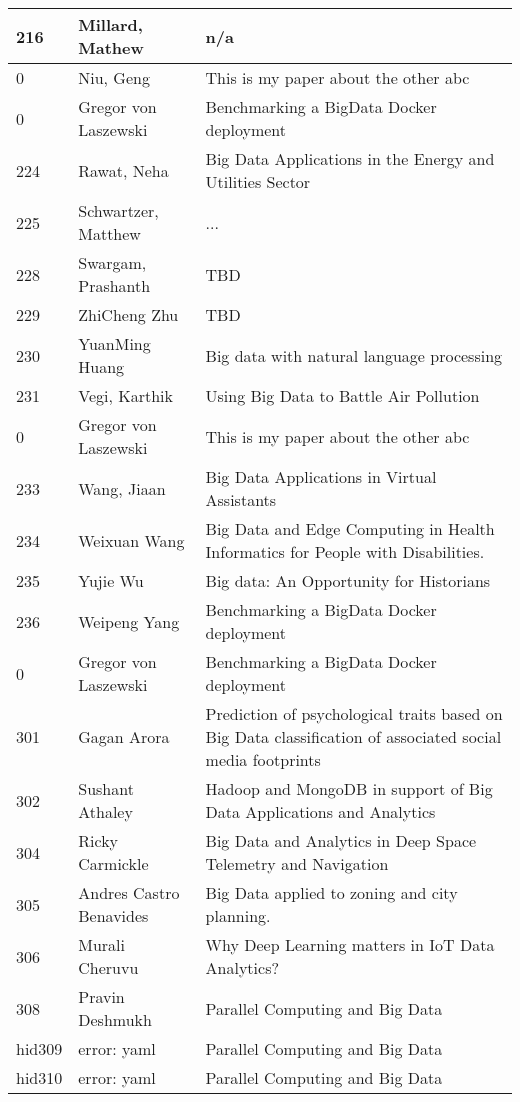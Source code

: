 \documentclass[12pt]{book}
\begin{document}
\begin{footnotesize}
\begin{longtable}{|p{1cm}p{5cm}p{9cm}|}
\hline
216 & Millard, Mathew & n/a  \\
\hline
0 & Niu, Geng & This is my paper about the other abc  \\
\hline
0 & Gregor von Laszewski & Benchmarking a BigData Docker deployment  \\
\hline
224 & Rawat, Neha & Big Data Applications in the Energy and Utilities Sector  \\
\hline
225 & Schwartzer, Matthew & ...  \\
\hline
228 & Swargam, Prashanth & TBD  \\
\hline
229 & ZhiCheng Zhu & TBD  \\
\hline
230 & YuanMing Huang & Big data with natural language processing  \\
\hline
231 & Vegi, Karthik & Using Big Data to Battle Air Pollution  \\
\hline
0 & Gregor von Laszewski & This is my paper about the other abc  \\
\hline
233 & Wang, Jiaan & Big Data Applications in Virtual Assistants  \\
\hline
234 & Weixuan Wang & Big Data and Edge Computing in Health Informatics for People with Disabilities.  \\
\hline
235 & Yujie Wu & Big data: An Opportunity for Historians  \\
\hline
236 & Weipeng Yang & Benchmarking a BigData Docker deployment  \\
\hline
0 & Gregor von Laszewski & Benchmarking a BigData Docker deployment  \\
\hline
301 & Gagan Arora & Prediction of psychological traits based on Big Data classification of associated social media footprints  \\
\hline
302 & Sushant Athaley & Hadoop and MongoDB in support of Big Data Applications and Analytics  \\
\hline
304 & Ricky Carmickle & Big Data and Analytics in Deep Space Telemetry and Navigation  \\
\hline
305 & Andres Castro Benavides & Big Data applied to zoning and city planning.  \\
\hline
306 & Murali Cheruvu & Why Deep Learning matters in IoT Data Analytics?  \\
\hline
308 & Pravin Deshmukh & Parallel Computing and Big Data  \\
\hline
hid309 & error: yaml & Parallel Computing and Big Data  \\
\hline
hid310 & error: yaml & Parallel Computing and Big Data  \\

\end{longtable}
\end{footnotesize}
\end{document}
